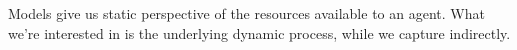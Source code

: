 \documentclass[10pt]{article}
\begin{document}
Models give us static perspective of the resources available to an agent.
What we're interested in is the underlying dynamic process, while we capture indirectly.






\end{document}
